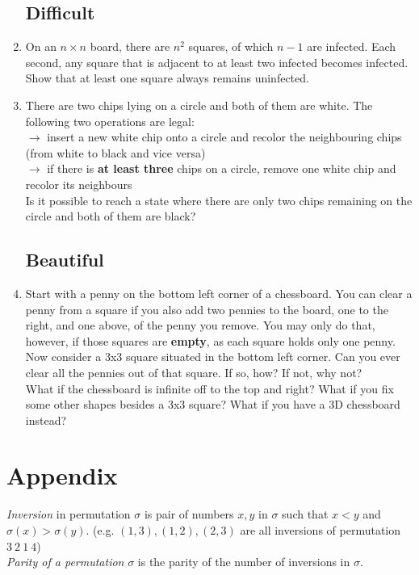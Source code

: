 \documentclass[11pt,a5paper]{article}
\begin{document}
\begin{enumerate}
	\subsection*{Difficult}

	\item{On an $n\times n$ board, there are $n^{2}$ squares, of which $n - 1$ are infected. Each second, any square that is adjacent to at least two infected becomes infected. Show that at least one square always remains uninfected.}

	
	\item {
		There are two chips lying on a circle and both of them are white. 		The following two operations are legal:\\
		$\rightarrow$ insert a new white chip onto a circle and recolor the neighbouring chips (from white to black and vice versa)\\
		$\rightarrow$ if there is \textbf{at least three} chips on a circle, remove one white chip and recolor its neighbours\\
		Is it possible to reach a state where there are only two chips remaining on the circle and both of them are black? 
	}
	
	\subsection*{Beautiful}
	\item{Start with a penny on the bottom left corner of a chessboard.  You can clear a penny from a square if you also add two pennies to the board, one to the right, and one above, of the penny you remove.  You may only do that, however, if those squares are \textbf{empty}, as each square holds only one penny.\\
Now consider a 3x3 square situated in the bottom left corner.  Can you ever clear all the pennies out of that square.  If so, how?  If not, why not? \\
What if the chessboard is infinite off to the top and right?  What if you fix some other shapes besides a 3x3 square?  What if you have a 3D chessboard instead?}
\end{enumerate}

\pagebreak

\section{Appendix}
\emph{Inversion} in permutation $\sigma$ is pair of numbers $x, y$ in $\sigma$ such that $x < y$ and $\sigma(x) > \sigma(y)$. (e.g. $(1,3), (1,2), (2,3)$ are all inversions of permutation $3\ 2\ 1\ 4$)\\
\noindent\emph{Parity of a permutation} $\sigma$ is the parity of the number of inversions in $\sigma$.\\
\end{document}
